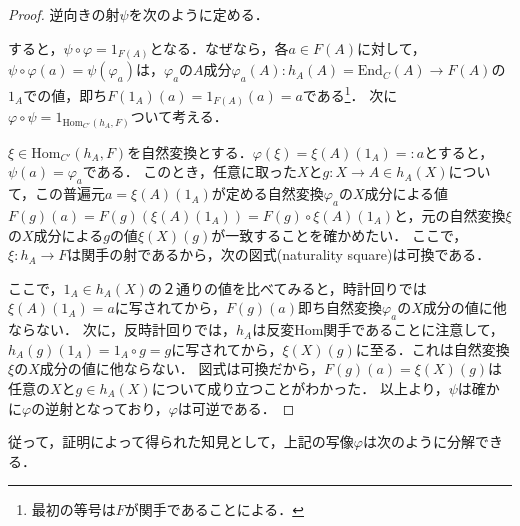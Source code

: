 \documentclass[uplatex, 12pt, dvipdfmx]{jsreport}
\begin{document}
\begin{proof}
    逆向きの射$\psi$を次のように定める．
    \begin{center}\end{center}
    
    すると，$\psi\circ\varphi =1_{F(A)}$となる．なぜなら，各$a\in F(A)$に対して，$\psi\circ\varphi(a)=\psi(\varphi_a)$は，$\varphi_a$の$A$成分$\varphi_a(A):h_A(A)=\mathrm{End}_C(A)\to F(A)$の$1_A$での値，即ち$F(1_A)(a)=1_{F(A)}(a)=a$である\footnote{最初の等号は$F$が関手であることによる．}．
    次に$\varphi\circ\psi =1_{\mathrm{Hom}_{C'}(h_A,F)}$ついて考える．

    $\xi\in\mathrm{Hom}_{C'}(h_A,F)$を自然変換とする．$\varphi(\xi)=\xi(A)(1_A)=:a$とすると，$\psi(a)=\varphi_a$である．
    このとき，任意に取った$X$と$g:X\to A\in h_A(X)$について，この普遍元$a=\xi(A)(1_A)$が定める自然変換$\varphi_a$の$X$成分による値$F(g)(a)=F(g)(\xi(A)(1_A))=F(g)\circ \xi(A)(1_A)$と，元の自然変換$\xi$の$X$成分による$g$の値$\xi (X)(g)$が一致することを確かめたい．
    ここで，$\xi:h_A\to F$は関手の射であるから，次の図式(naturality square)は可換である．
    \begin{center}\end{center}
    ここで，$1_A\in h_A(X)$の２通りの値を比べてみると，時計回りでは$\xi(A)(1_A)=a$に写されてから，$F(g)(a)$即ち自然変換$\varphi_a$の$X$成分の値に他ならない．
    次に，反時計回りでは，$h_A$は反変Hom関手であることに注意して，\rm{}$h_A(g)(1_A)=1_A\circ g=g$に写されてから，$\xi(X)(g)$に至る．これは自然変換$\xi$の$X$成分の値に他ならない．
    図式は可換だから，$F(g)(a)=\xi (X)(g)$は任意の$X$と$g\in h_A(X)$について成り立つことがわかった．
    以上より，$\psi$は確かに$\varphi$の逆射となっており，$\varphi$は可逆である．
\end{proof}
従って，証明によって得られた知見として，上記の写像$\varphi$は次のように分解できる．
\begin{center}\end{center}
\end{document}

